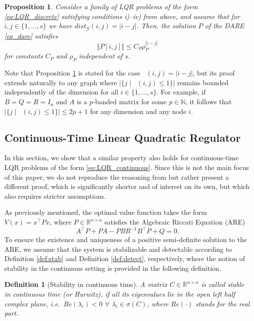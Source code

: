 \documentclass{article}
\newcommand{\R}{\mathbb{R}}
\DeclareMathOperator{\distG}{\operatorname{dist_\mathcal{G}}} %
\newcommand{\agents}{\lbrace 1, \dots, s \rbrace}
\newtheorem{definition}{Definition}[section]
\newtheorem{prop}{Proposition}[section]
\begin{document}
\begin{prop} \label{prop.DecayP}
    Consider a family of  LQR problems of the form \eqref{eq:LQR_discrete} satisfying conditions i)--iv) from above, and assume that for $i,j \in \{1,\ldots,s\}$ we have $dist_{\mathcal G}(i,j) = | i - j |$. Then, the solution $P$ of the DARE \eqref{eq_dare} satisfies
    $$
    \Vert P[i,j] \Vert \le  C_P \rho_P^{|i-j|}
    $$
     for constants $C_P$ and $\rho_P$ independent of $s$.  
\end{prop}

Note that Proposition \ref{prop.DecayP} is stated for the case \(\distG(i,j) = |i-j|\), but its proof extends naturally to any graph where \(| \{ j \mid \distG(i,j) \leq 1 \} |\) remains bounded independently of the dimension for all \( i \in \agents \). For example, if \( B = Q = R = I_n \) and \( A \) is a \( p \)-banded matrix for some \( p \in \mathbb{N} \), it follows that \(| \{ j \mid \distG(i,j) \leq 1 \} | \leq 2p + 1 \) for any dimension and any node \( i \).


\subsection{Continuous-Time Linear Quadratic Regulator}\label{sec:contlqr}

In this section, we show that a similar property also holds for continuous-time LQR problems of the form \eqref{eq:LQR_continuous}. 
Since this is not the main focus of this paper, we do not reproduce the reasoning from \cite{sperl2023separable,shin2022lqr} but rather present a different proof, which is significantly shorter and of interest on its own, but which also requires stricter assumptions.

As previously mentioned, the optimal value function takes the form $ V(x)= x^\top P x$,
where $P \in \R^{n \times n}$ satisfies the Algebraic Riccati Equation (ARE)
\begin{equation}
    A^\top P + P A - P B R^{-1} B^\top P + Q = 0.
    \label{ARE}
\end{equation}
To ensure the existence and uniqueness of a positive semi-definite solution to the ARE, we assume that the system is stabilizable and detectable according to Definition \ref{def:stab} and Definition \ref{def:detect}, respectively, where the notion of stability in the continuous setting is provided in the following definition.
\begin{definition}[Stability in continuous time]
    A matrix $C \in \mathbb{R}^{n \times n}$ is called stable in continuous time (or Hurwitz), if all its eigenvalues lie in the
open left half complex plane, i.e.\ $Re(\lambda_i) <0$ $\forall$ $\lambda_i \in \sigma(C)$, where $Re(\cdot)$ stands for the real part.
\end{definition}
\end{document}
